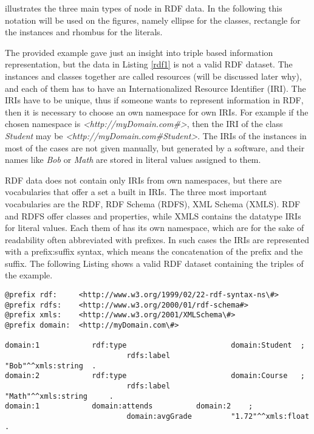 
 illustrates the three main types of node in RDF data. In the following this notation will be used on the figures, namely ellipse for the classes, rectangle for the instances and rhombus for the literals.

The provided example gave just an insight into triple based information representation, but the data in Listing \ref{rdf1} is not a valid RDF dataset. The instances and classes together are called resources (will be discussed later why), and each of them has to have an Internationalized Resource Identifier (IRI). The IRIs have to be unique, thus if someone wants to represent information in RDF, then it is necessary to choose an own namespace for own IRIs. For example if the chosen namespace is \textit{<http://myDomain.com\#>}, then the IRI of the class \textit{Student} may be \textit{<http://myDomain.com\#Student>}. The IRIs of the instances in most of the cases are not given manually, but generated by a software, and their names like \textit{Bob} or \textit{Math} are stored in literal values assigned to them.

RDF data does not contain only IRIs from own namespaces, but there are vocabularies that offer a set a built in IRIs. The three most important vocabularies are the RDF, RDF Schema (RDFS), XML Schema (XMLS). RDF and RDFS offer classes and properties, while XMLS contains the datatype IRIs for literal values. Each them of has its own namespace, which are for the sake of readability often abbreviated with prefixes. In such cases the IRIs are represented with a prefix:suffix syntax, which means the concatenation of the prefix and the suffix. The following Listing shows a valid RDF dataset containing the triples of the example.

\begin{lstlisting}[basicstyle=\footnotesize, captionpos=b, caption=RDF data in N3 serialization format, label=lst:sparql,  belowskip=1em, aboveskip=2em,
frame=single]
@prefix rdf:  	 <http://www.w3.org/1999/02/22-rdf-syntax-ns\#>
@prefix rdfs:    <http://www.w3.org/2000/01/rdf-schema#>
@prefix xmls:    <http://www.w3.org/2001/XMLSchema\#>
@prefix domain:  <http://myDomain.com\#>

domain:1			rdf:type						domain:Student 	;
							rdfs:label					"Bob"^^xmls:string 	.
domain:2			rdf:type						domain:Course 	;
							rdfs:label					"Math"^^xmls:string 	.
domain:1			domain:attends			domain:2 	;
							domain:avgGrade			"1.72"^^xmls:float .
\end{lstlisting}

